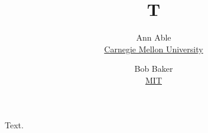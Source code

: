\documentclass{article}
\title{T}
\author{Ann Able \\ \href{https://www.cmu.edu}{Carnegie Mellon University} \and Bob Baker \\ \href{https://www.mit.edu}{MIT}}
\begin{document}
\maketitle
Text.
\end{document}
